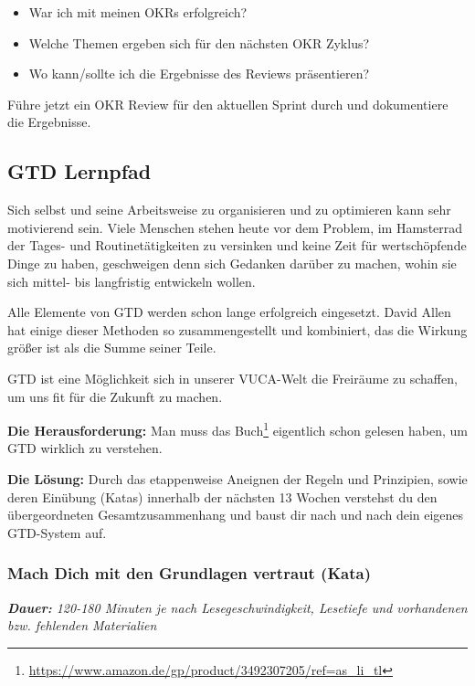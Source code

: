 \documentclass[
  ngerman,
  paper=a4,
,captions=tableheading
]{scrartcl}
\DeclareRobustCommand{\href}[2]{#2\footnote{\url{#1}}}
\providecommand{\tightlist}{%
  \setlength{\itemsep}{0pt}\setlength{\parskip}{0pt}}
\begin{document}
\begin{itemize}
\tightlist
\item
  War ich mit meinen OKRs erfolgreich?
\item
  Welche Themen ergeben sich für den nächsten OKR Zyklus?
\item
  Wo kann/sollte ich die Ergebnisse des Reviews präsentieren?
\end{itemize}

Führe jetzt ein OKR Review für den aktuellen Sprint durch und
dokumentiere die Ergebnisse.

\hypertarget{gtd-lernpfad}{%
\subsection{GTD Lernpfad}\label{gtd-lernpfad}}

Sich selbst und seine Arbeitsweise zu organisieren und zu optimieren
kann sehr motivierend sein. Viele Menschen stehen heute vor dem Problem,
im Hamsterrad der Tages- und Routinetätigkeiten zu versinken und keine
Zeit für wertschöpfende Dinge zu haben, geschweigen denn sich Gedanken
darüber zu machen, wohin sie sich mittel- bis langfristig entwickeln
wollen.

Alle Elemente von GTD werden schon lange erfolgreich eingesetzt. David
Allen hat einige dieser Methoden so zusammengestellt und kombiniert, das
die Wirkung größer ist als die Summe seiner Teile.

GTD ist eine Möglichkeit sich in unserer VUCA-Welt die Freiräume zu
schaffen, um uns fit für die Zukunft zu machen.

\textbf{Die Herausforderung:} Man muss das
\href{https://www.amazon.de/gp/product/3492307205/ref=as_li_tl}{Buch}
eigentlich schon gelesen haben, um GTD wirklich zu verstehen.

\textbf{Die Lösung:} Durch das etappenweise Aneignen der Regeln und
Prinzipien, sowie deren Einübung (Katas) innerhalb der nächsten 13
Wochen verstehst du den übergeordneten Gesamtzusammenhang und baust dir
nach und nach dein eigenes GTD-System auf.

\hypertarget{mach-dich-mit-den-grundlagen-vertraut-kata}{%
\subsubsection{Mach Dich mit den Grundlagen vertraut
(Kata)}\label{mach-dich-mit-den-grundlagen-vertraut-kata}}

\emph{\textbf{Dauer:} 120-180 Minuten je nach Lesegeschwindigkeit,
Lesetiefe und vorhandenen bzw. fehlenden Materialien}
\end{document}
